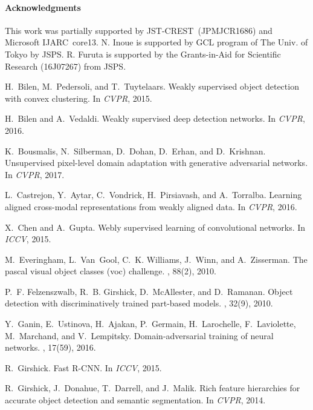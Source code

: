 \documentclass[10pt,twocolumn,letterpaper]{article}
\begin{document}
\paragraph{Acknowledgments}
This work was partially supported by JST-CREST~(JPMJCR1686) and Microsoft IJARC~core13.
N. Inoue is supported by GCL program of The Univ. of Tokyo by JSPS.
R. Furuta is supported by the Grants-in-Aid for Scientific Research (16J07267) from JSPS.
{\small
\begin{thebibliography}{10}\itemsep=-1pt

H.~Bilen, M.~Pedersoli, and T.~Tuytelaars.
\newblock Weakly supervised object detection with convex clustering.
\newblock In {\em CVPR}, 2015.

H.~Bilen and A.~Vedaldi.
\newblock Weakly supervised deep detection networks.
\newblock In {\em CVPR}, 2016.

K.~Bousmalis, N.~Silberman, D.~Dohan, D.~Erhan, and D.~Krishnan.
\newblock Unsupervised pixel-level domain adaptation with generative
  adversarial networks.
\newblock In {\em CVPR}, 2017.

L.~Castrejon, Y.~Aytar, C.~Vondrick, H.~Pirsiavash, and A.~Torralba.
\newblock Learning aligned cross-modal representations from weakly aligned
  data.
\newblock In {\em CVPR}, 2016.

X.~Chen and A.~Gupta.
\newblock Webly supervised learning of convolutional networks.
\newblock In {\em ICCV}, 2015.

M.~Everingham, L.~Van~Gool, C.~K. Williams, J.~Winn, and A.~Zisserman.
\newblock The pascal visual object classes (voc) challenge.
, 88(2), 2010.

P.~F. Felzenszwalb, R.~B. Girshick, D.~McAllester, and D.~Ramanan.
\newblock Object detection with discriminatively trained part-based models.
, 32(9), 2010.

Y.~Ganin, E.~Ustinova, H.~Ajakan, P.~Germain, H.~Larochelle, F.~Laviolette,
  M.~Marchand, and V.~Lempitsky.
\newblock Domain-adversarial training of neural networks.
, 17(59), 2016.

R.~Girshick.
\newblock Fast {R-CNN}.
\newblock In {\em ICCV}, 2015.

R.~Girshick, J.~Donahue, T.~Darrell, and J.~Malik.
\newblock Rich feature hierarchies for accurate object detection and semantic
  segmentation.
\newblock In {\em CVPR}, 2014.


\end{thebibliography}}
\end{document}

